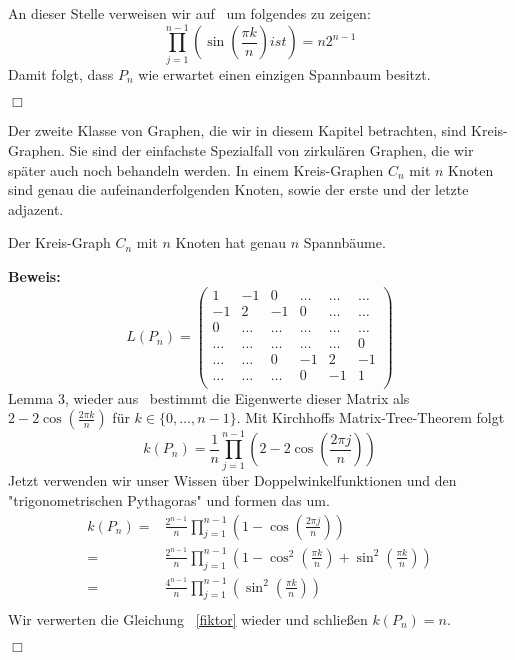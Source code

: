 An dieser Stelle verweisen wir auf~\cite{fiktor_2010} um folgendes zu zeigen:
\begin{equation}
 \prod_{j=1}^{n-1} \left(\sin\left(\frac{\pi k}{n}\right) ist \right)=n2^{n-1}
 \label{fiktor}
\end{equation}
Damit folgt, dass $P_n$ wie erwartet einen einzigen Spannbaum besitzt.
\begin{flushright} $\Box$ \end{flushright}
Der zweite Klasse von Graphen, die wir in diesem Kapitel betrachten, sind Kreis-Graphen.
Sie sind der einfachste Spezialfall von zirkulären Graphen, die wir später auch noch behandeln werden. In einem Kreis-Graphen $C_n$ mit $n$ Knoten sind genau die aufeinanderfolgenden Knoten, sowie der erste und der letzte adjazent. 
\begin{Lms}
 Der Kreis-Graph $C_n$ mit $n$ Knoten hat genau $n$ Spannbäume.
\end{Lms}
\textbf{Beweis:}
\begin{equation}
L(P_n)=
\begin{pmatrix}
1&-1&0&\ldots&\ldots&\ldots\\
-1&2&-1&0&\ldots&\ldots\\
0&\ldots&\ldots&\ldots&\ldots&\ldots\\
\ldots&\ldots&\ldots&\ldots&\ldots&0\\
\ldots&\ldots&0&-1&2&-1\\
\ldots&\ldots&\ldots&0&-1&1\\
\end{pmatrix}
\end{equation}
Lemma 3, wieder aus~\cite{daoud_2014} bestimmt die Eigenwerte 
dieser Matrix als $2-2\cos {\left(\frac{2\pi k}{n}\right)}$ für $k \in \{0,\ldots,n-1\}$.
Mit Kirchhoffs Matrix-Tree-Theorem folgt
\begin{equation}
 \mathit{k}(P_n)=\frac{1}{n}\prod_{j=1}^{n-1} \left(2-2\cos \left(\frac{2\pi j}{n}\right)\right)
\end{equation}
Jetzt verwenden wir unser Wissen über Doppelwinkelfunktionen und den "trigonometrischen Pythagoras" und formen das um.
\begin{equation}
\begin{split}
 \mathit{k}(P_n)={} & \frac{2^{n-1}}{n}\prod_{j=1}^{n-1} \left(1-\cos \left(\frac{2\pi j}{n}\right)\right)\\
 = {}&\frac{2^{n-1}}{n}\prod_{j=1}^{n-1} \left( 1 - \cos^2\left(\frac{\pi k}{n}\right)+\sin^2\left(\frac{\pi k}{n}\right) \right)\\
 = {}& \frac{4^{n-1}}{n}\prod_{j=1}^{n-1} \left(\sin^2\left(\frac{\pi k}{n}\right) \right)\\
\end{split}
\end{equation}
Wir verwerten die Gleichung ~\ref{fiktor} wieder und schließen $\mathit{k}(P_n)=n$.
\begin{flushright} $\Box$ \end{flushright} 
